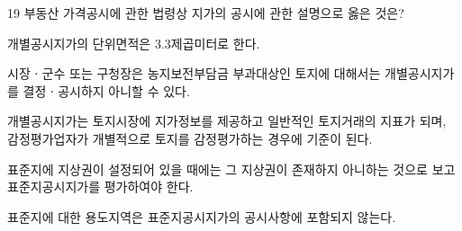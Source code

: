 \begin{question}{19}
부동산 가격공시에 관한 법령상 지가의 공시에 관한 설명으로 옳은 것은?
\begin{choices}
  \item 개별공시지가의 단위면적은 3.3제곱미터로 한다.
  \item 시장ㆍ군수 또는 구청장은 농지보전부담금 부과대상인 토지에 대해서는 개별공시지가를 결정ㆍ공시하지 아니할 수 있다.
  \item 개별공시지가는 토지시장에 지가정보를 제공하고 일반적인 토지거래의 지표가 되며, 감정평가업자가 개별적으로 토지를 감정평가하는 경우에 기준이 된다.
  \item 표준지에 지상권이 설정되어 있을 때에는 그 지상권이 존재하지 아니하는 것으로 보고 표준지공시지가를 평가하여야 한다.
  \item 표준지에 대한 용도지역은 표준지공시지가의 공시사항에 포함되지 않는다.
\end{choices}
\end{question}

